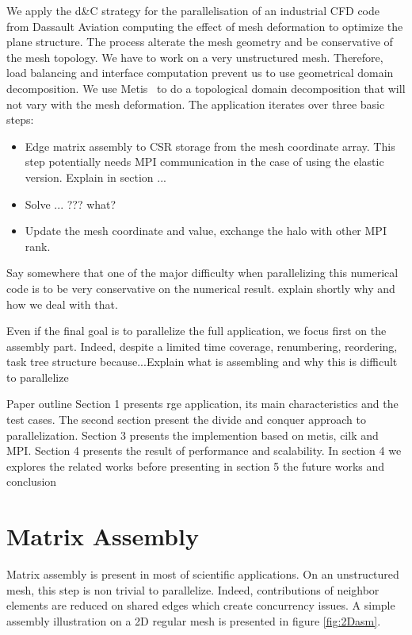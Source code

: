 \documentclass{IOS-Book-Article}
\begin{document}
We apply the d\&C strategy for the parallelisation of an industrial CFD code from Dassault Aviation computing the effect of mesh deformation to optimize the plane structure.
The process alterate the mesh geometry and be conservative of the mesh topology.  We have to work on a very unstructured mesh. Therefore, load balancing and interface
computation prevent us to use geometrical domain decomposition.
We use Metis~\cite{Metis} to do a topological domain decomposition that will not vary with the mesh deformation.
The application iterates over three basic steps:
\begin{itemize}
\item Edge matrix assembly to CSR storage from the mesh coordinate array. This step potentially needs MPI communication in the case of using the elastic version.
Explain in section ...
\item Solve ... ??? what?
\item Update the mesh coordinate and value, exchange the halo with other MPI rank.
\end{itemize}
Say somewhere that one of the major difficulty when parallelizing this numerical code is to be very conservative on the numerical result. explain shortly why and how we deal
with that.

Even if the final goal is to parallelize the full application, we focus first on the assembly part. Indeed, despite a limited time coverage, renumbering, reordering,
task tree structure because...Explain what is assembling and why this is difficult to parallelize

Paper outline
Section 1 presents rge application, its main characteristics and the test cases.
The second section present the divide and conquer approach to parallelization. 
Section 3 presents the implemention based on metis, cilk and MPI.
Section 4 presents the result of performance and scalability. 
In section 4 we explores the related works before presenting in section 5 the future works and conclusion

\section{Matrix Assembly}
Matrix assembly is present in most of scientific applications. On an unstructured mesh, this step is non trivial to parallelize.
Indeed, contributions of neighbor elements are reduced on shared edges which create concurrency issues.
A simple assembly illustration on a 2D regular mesh is presented in figure \ref{fig:2Dasm}.
\end{document}
